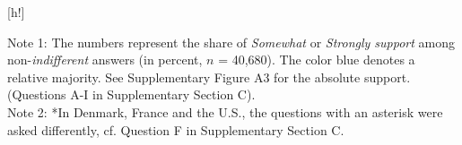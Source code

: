 \documentclass{nature}
\makeatletter
\renewenvironment*{figure}{\@float{figure}}{\end@float}
\makeatother
\begin{document}
\begin{figure}[h!]
  \caption[Relative support for global climate policies]{Relative support for global climate policies (Reproduced from Dechezleprêtre et al. (2022),\cite{dechezlepretre_fighting_2022} Figure A21.).} %
  \label{fig:oecd} %
  {\footnotesize %
  Note 1: The numbers represent the share of \textit{Somewhat} or \textit{Strongly support} among non-\textit{indifferent} answers (in percent, $n$ = 40,680). The color blue denotes a relative majority. See Supplementary Figure A3 for the absolute support. (Questions A-I in Supplementary Section C).
  \\ Note 2: *In Denmark, France and the U.S., the questions with an asterisk were asked differently, cf. Question F in Supplementary Section C.%
  } 
\end{figure}
\end{document}
